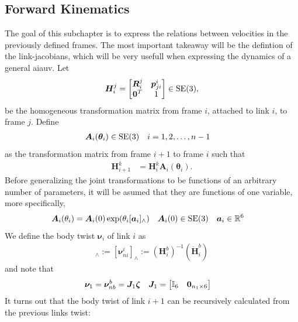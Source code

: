 \subsection{Forward Kinematics}
\label{sec:forward_kinematics}
% 
The goal of this subchapter is to express the relations between velocities in
the previously defined frames. The most important takeaway will
be the defintion of the link-jacobians, which will be very usefull when expressing
the dynamics of a general \gls{aiauv}.
Let
\begin{align}
    \bm{H}_i^j = \begin{bmatrix}
        \bm{R}_i^j & \bm{p}_{ji}^i \\
        \bm{0}^T & 1
    \end{bmatrix} \in \operatorname{SE}(3),
\end{align}
be the homogeneous transformation matrix from frame $i$, attached to link $i$,
to frame $j$. Define
\begin{align}
    \bm{A}_i(\bm{\theta}_i) &\in \operatorname{SE}(3) & i &= 1, 2, \ldots, n-1
\end{align}
as the transformation matrix from frame $i+1$ to frame $i$ such that
\begin{align}
    \bm{H}_{i+1}^k &= \bm{H}_i^k \bm{A}_i(\bm{\theta}_i). \label{eq:mod:Hi}
\end{align}
Before generalizing the joint transformations to be functions of an arbitrary number of parameters,
it will be asumed that they are functions of one variable, more specifically,
\begin{align}
    \bm{A}_i(\theta_i) &= \bm{A}_i(0) \exp(\theta_i[\bm{a}_i]_{\wedge}) & \bm{A}_i(0) &\in \operatorname{SE}(3) & \bm{a}_i&\in \mathbb{R}^6
\end{align}
We define the body twist $\bm{\nu}_i$ of link $i$ as
\begin{align}
    [\bm{\nu}_i]_{\wedge} := [\bm{\nu}_{ni}^i]_{\wedge} := (\bm{H}_i^b)^{-1}(\dot{\bm{H}}_i^b)
\end{align}
and note that
\begin{align}
    \bm{\nu}_1 &= \bm{\nu}_{nb}^b = \bm{J}_1 \bm{\zeta} &
    \bm{J}_1 &= \begin{bmatrix}\mathbb{I}_{6} & \bm{0}_{n_1\times6}\end{bmatrix}
\end{align}
It turns out that the body twist of link $i+1$ can be recursively calculated from
the previous links twist:
